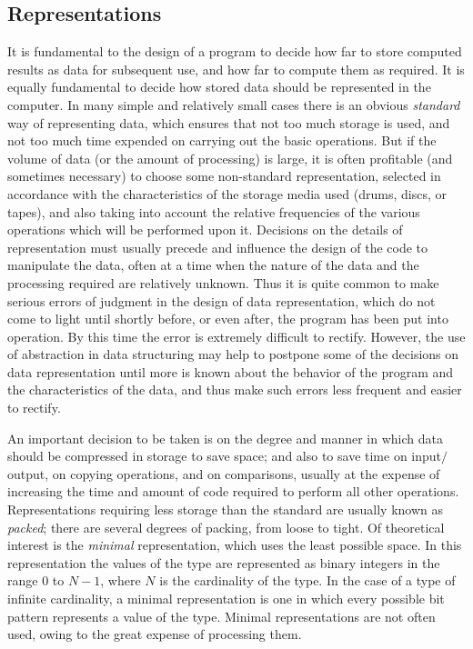 \documentclass[twoside,11pt]{book}
\begin{document}
\subsection{Representations}

It is fundamental to the design of a program to decide how far to store computed results as data for subsequent use, and how far to compute them as required. It is equally fundamental to decide how stored data should be represented in the computer. In many simple and relatively small cases there is an obvious \textit{standard} way of representing data, which ensures that not too much storage is used, and not too much time expended on carrying out the basic operations. But if the volume of data (or the amount of processing) is large, it is often profitable (and sometimes necessary) to choose some non-standard representation, selected in accordance with the characteristics of the storage media used (drums, discs, or tapes), and also taking into account the relative frequencies of the various operations which will be performed upon it. Decisions on the details of representation must usually precede and influence the design of the code to manipulate the data, often at a time when the nature of the data and the processing required are relatively unknown. Thus it is quite common to make serious errors of judgment in the design of data representation, which do not come to light until shortly before, or even after, the program has been put into operation. By this time the error is extremely difficult to rectify. However, the use of abstraction in data structuring may help to postpone some of the decisions on data representation until more is known about the behavior of the program and the characteristics of the data, and thus make such errors less frequent and easier to rectify.

An important decision to be taken is on the degree and manner in which data should be compressed in storage to save space; and also to save time on input$/$output, on copying operations, and on comparisons, usually at the expense of increasing the time and amount of code required to perform all other operations. Representations requiring less storage than the standard are usually known as \textit{packed}; there are several degrees of packing, from loose to tight. Of theoretical interest is the \textit{minimal} representation, which uses the least possible space. In this representation the values of the type are represented as binary integers in the range 0 to $N - 1$, where $N$ is the cardinality of the type. In the case of a type of infinite cardinality, a minimal representation is one in which every possible bit pattern represents a value of the type. Minimal representations are not often used, owing to the great expense of processing them.
\end{document}
